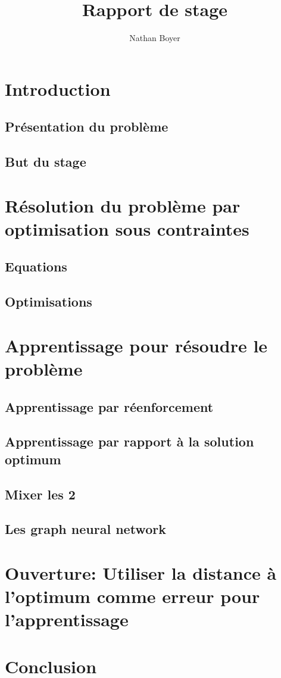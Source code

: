 \documentclass{article}
\title{Rapport de stage}
\author{Nathan Boyer}
\begin{document}
\maketitle

\section{Introduction}

\subsection{Présentation du problème}

\subsection{But du stage}

\section{Résolution du problème par optimisation sous contraintes}

\subsection{Equations}

\subsection{Optimisations}

\section{Apprentissage pour résoudre le problème}

\subsection{Apprentissage par réenforcement}

\subsection{Apprentissage par rapport à la solution optimum}

\subsection{Mixer les 2}

\subsection{Les graph neural network}

\section{Ouverture: Utiliser la distance à l'optimum comme erreur pour l'apprentissage}

\section{Conclusion}
\end{document}
